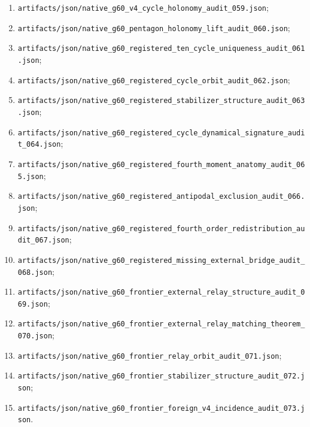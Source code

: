 \begin{enumerate}
    \item
    \texttt{artifacts/json/native\_g60\_v4\_cycle\_holonomy\_audit\_059.json};

    \item
    \texttt{artifacts/json/native\_g60\_pentagon\_holonomy\_lift\_audit\_060.json};

    \item
    \texttt{artifacts/json/native\_g60\_registered\_ten\_cycle\_uniqueness\_audit\_061.json};

    \item
    \texttt{artifacts/json/native\_g60\_registered\_cycle\_orbit\_audit\_062.json};

    \item
    \texttt{artifacts/json/native\_g60\_registered\_stabilizer\_structure\_audit\_063.json};

    \item
    \texttt{artifacts/json/native\_g60\_registered\_cycle\_dynamical\_signature\_audit\_064.json};

    \item
    \texttt{artifacts/json/native\_g60\_registered\_fourth\_moment\_anatomy\_audit\_065.json};

    \item
    \texttt{artifacts/json/native\_g60\_registered\_antipodal\_exclusion\_audit\_066.json};

    \item
    \texttt{artifacts/json/native\_g60\_registered\_fourth\_order\_redistribution\_audit\_067.json};

    \item
    \texttt{artifacts/json/native\_g60\_registered\_missing\_external\_bridge\_audit\_068.json};

    \item
    \texttt{artifacts/json/native\_g60\_frontier\_external\_relay\_structure\_audit\_069.json};

    \item
    \texttt{artifacts/json/native\_g60\_frontier\_external\_relay\_matching\_theorem\_070.json};

    \item
    \texttt{artifacts/json/native\_g60\_frontier\_relay\_orbit\_audit\_071.json};

    \item
    \texttt{artifacts/json/native\_g60\_frontier\_stabilizer\_structure\_audit\_072.json};

    \item
    \texttt{artifacts/json/native\_g60\_frontier\_foreign\_v4\_incidence\_audit\_073.json}.
\end{enumerate}
